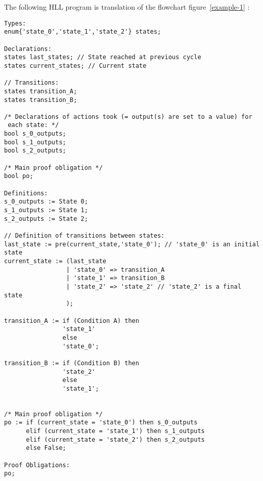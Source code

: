 The following HLL program is translation of the flowchart
figure~\ref{example-1} : 
{\footnotesize
\begin{verbatim}
Types:
enum{'state_0','state_1','state_2'} states;

Declarations:
states last_states; // State reached at previous cycle
states current_states; // Current state

// Transitions:
states transition_A;
states transition_B;

/* Declarations of actions took (= output(s) are set to a value) for
 each state: */
bool s_0_outputs;
bool s_1_outputs;
bool s_2_outputs;

/* Main proof obligation */
bool po;

Definitions:
s_0_outputs := State 0;
s_1_outputs := State 1;
s_2_outputs := State 2;

// Definition of transitions between states:
last_state := pre(current_state,'state_0'); // 'state_0' is an initial state
current_state := (last_state
                 | 'state_0' => transition_A
                 | 'state_1' => transition_B
                 | 'state_2' => 'state_2' // 'state_2' is a final state
                 );

transition_A := if (Condition A) then
                'state_1'
                else
                'state_0';

transition_B := if (Condition B) then
                'state_2'
                else
                'state_1';


/* Main proof obligation */
po := if (current_state = 'state_0') then s_0_outputs
      elif (current_state = 'state_1') then s_1_outputs
      elif (current_state = 'state_2') then s_2_outputs
      else False;

Proof Obligations:
po;
\end{verbatim}
}


